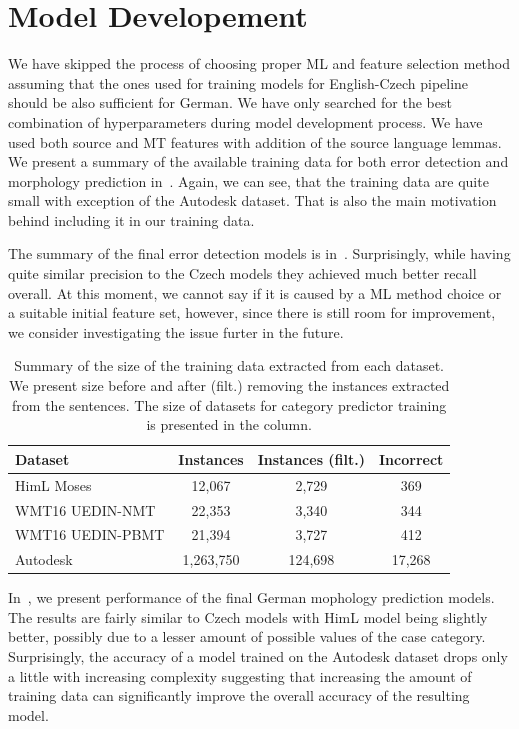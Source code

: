 \section{Model Developement}

We have skipped the process of choosing proper ML and feature selection method
assuming that the ones used for training models for English-Czech pipeline should
be also sufficient for German. We have only searched for the best combination
of hyperparameters during model development process. We have used both source
and MT features with addition of the source language lemmas. We present a summary
of the available training data for both error detection and morphology prediction in~.
Again, we can see, that the training data are quite small with exception of the Autodesk
dataset. That is also the main motivation behind including it in our training data.

The summary of the final error detection models is in~. Surprisingly,
while having quite similar precision to the Czech models they achieved much better
recall overall. At this moment, we cannot say if it is caused by a ML method choice or a suitable
initial feature set, however, since there is still room for improvement, we consider investigating
the issue furter in the future.

\begin{table}[t]
\centering
\small

\begin{tabular}{lccc}
Dataset  &  \hash{} Instances  &  \hash{} Instances (filt.)  &  \hash{} Incorrect  \\
\hline
HimL Moses  & 12,067  &  2,729  &  369  \\
WMT16 UEDIN-NMT  &  22,353  &  3,340  &  344  \\
WMT16 UEDIN-PBMT  &  21,394  &   3,727  &  412  \\
Autodesk  &  1,263,750  &  124,698  &  17,268  \\
\end{tabular}
\caption{
    Summary of the size of the training data extracted from each dataset. We present
size before and after (filt.) removing the instances extracted from the  sentences.
The size of datasets for category predictor training is presented in the  column.
}
\label{wf-cat-data-sum}
\end{table}

In~, we present performance of the final German
mophology prediction models. The results are fairly similar to Czech models with
HimL model being slightly better, possibly due to a lesser amount of possible values
of the case category. Surprisingly, the accuracy of  a model trained on the Autodesk
dataset drops only a little with increasing complexity suggesting that increasing
the amount of training data can significantly improve the overall accuracy of the
resulting model.


